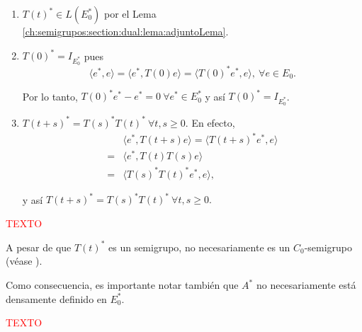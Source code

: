 \begin{enumerate}
    \item $T(t)^* \in L(E_0^*)$ por el Lema \ref{ch:semigrupos:section:dual:lema:adjuntoLema}.

    \item $T(0)^* = I_{E_0^*}$ pues 
    \[\langle e^*, e \rangle = \langle e^*, T(0)e \rangle = \langle T(0)^*e^*, e \rangle ,\ \forall e \in E_0.\]

    Por lo tanto, $T(0)^*e^* - e^* = 0 \ \forall e^* \in E_0^*$ y así $T(0)^* = I_{E_0^*}$.

    \item $T(t+s)^* = T(s)^*T(t)^* \ \forall t ,s \geq 0$. En efecto,
    \begin{align*}
        &\langle e^*, T(t+s)e \rangle = \langle T(t+s)^*e^*, e \rangle\\
        =&\langle e^*, T(t)T(s)e \rangle\\
        =&\langle T(s)^*T(t)^*e^*, e \rangle,
    \end{align*}

    y así $T(t+s)^* = T(s)^*T(t)^* \ \forall t,s \geq 0.$
\end{enumerate}

\textcolor{red}{TEXTO}\\

\begin{Observacion}
    \label{ObsC0Dual}

    A pesar de que $T(t)^*$ es un semigrupo, no necesariamente es un $C_0$-semigrupo (véase \cite[Par.~I.1.13]{engel-2006-sho-cou-ope}).

    Como consecuencia, es importante notar también que $A^*$ no necesariamente está densamente definido en $E_0^*$.
\end{Observacion}

\textcolor{red}{TEXTO}

